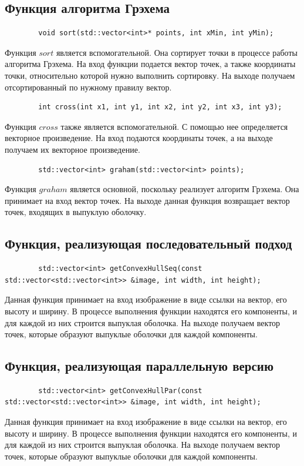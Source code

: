 \documentclass[a4paper, 12pt]{extarticle}
\begin{document}
	\subsection{Функция алгоритма Грэхема}
	\begin{verbatim}
		void sort(std::vector<int>* points, int xMin, int yMin);
	\end{verbatim}
	Функция $sort$ является вспомогательной. Она сортирует точки в процессе работы алгоритма Грэхема. На вход функции подается вектор точек, а также координаты точки, относительно которой нужно выполнить сортировку. На выходе получаем отсортированный по нужному правилу вектор.
	\begin{verbatim}
		int cross(int x1, int y1, int x2, int y2, int x3, int y3);
	\end{verbatim}
	Функция $cross$ также является вспомогательной. С помощью нее определяется векторное произведение. На вход подаются координаты точек, а на выходе получаем их векторное произведение.
	\begin{verbatim}
		std::vector<int> graham(std::vector<int> points);
	\end{verbatim}
	Функция $graham$ является основной, поскольку реализует алгоритм Грэхема. Она принимает на вход вектор точек. На выходе данная функция возвращает вектор точек, входящих в выпуклую оболочку.
	
	\subsection{Функция, реализующая последовательный подход}
	\begin{verbatim}
		std::vector<int> getConvexHullSeq(const std::vector<std::vector<int>> &image, int width, int height);
	\end{verbatim}
	Данная функция принимает на вход изображение в виде ссылки на вектор, его высоту и ширину. В процессе выполнения функции находятся его компоненты, и для каждой из них строится выпуклая оболочка. На выходе получаем вектор точек, которые образуют выпуклые оболочки для каждой компоненты.
	
	\subsection{Функция, реализующая параллельную версию}
	\begin{verbatim}
		std::vector<int> getConvexHullPar(const std::vector<std::vector<int>> &image, int width, int height);
	\end{verbatim}
	Данная функция принимает на вход изображение в виде ссылки на вектор, его высоту и ширину. В процессе выполнения функции находятся его компоненты, и для каждой из них строится выпуклая оболочка. На выходе получаем вектор точек, которые образуют выпуклые оболочки для каждой компоненты.
	
\end{document}
